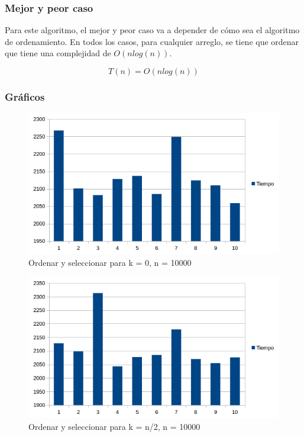\subsubsection{Mejor y peor caso}
Para este algoritmo, el mejor y peor caso va a depender de cómo sea el algoritmo de ordenamiento. En todos los casos, para cualquier arreglo, se tiene que ordenar que tiene una complejidad de $O(nlog(n))$.

$$ T(n) = O(nlog(n))$$

\subsubsection{Gráficos}
\begin{figure}[H]
\centering
\includegraphics[width=\textwidth]{KZero/OrderAndSelectK0.png}
\caption{Ordenar y seleccionar para k = 0, n = 10000}
\end{figure}

\begin{figure}[H]
\centering
\includegraphics[width=\textwidth]{KN2/OrderAndSelectN2.png}
\caption{Ordenar y seleccionar para k = n/2, n = 10000}
\end{figure}

